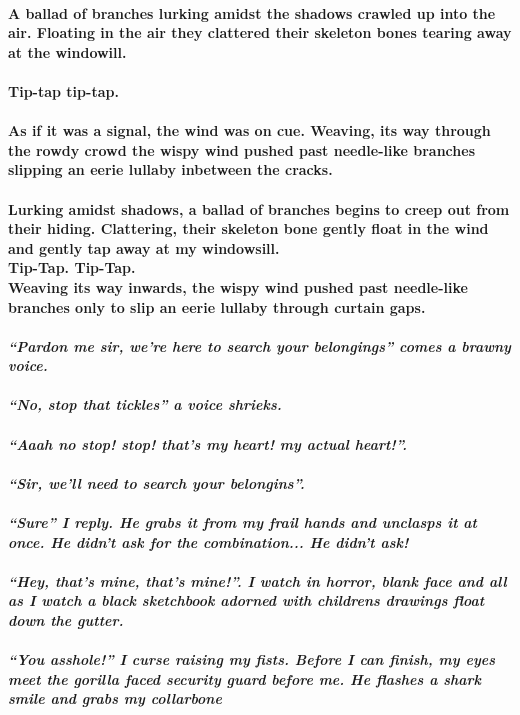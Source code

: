 \documentclass{book}
\begin{document}
\paragraph{A ballad of branches lurking amidst the shadows crawled up into the air. Floating in the air they clattered their skeleton bones tearing away at the windowill.\\\\Tip-tap tip-tap.\\\\As if it was a signal, the wind was on cue. Weaving, its way through the rowdy crowd the wispy wind pushed past needle-like branches slipping an eerie lullaby inbetween the cracks.}
\paragraph{Lurking amidst shadows, a ballad of branches begins to creep out from their hiding. Clattering, their skeleton bone gently float in the wind and gently tap away at my windowsill.\\Tip-Tap. Tip-Tap.\\Weaving its way inwards, the wispy wind pushed past needle-like branches only to slip an eerie lullaby through curtain gaps.}

\paragraph{\textit{``Pardon me sir, we're here to search your belongings'' comes a brawny voice.\\\\``No, stop that tickles'' a voice shrieks.\\\\``Aaah no stop! stop! that's my heart! my actual heart!''.\\\\``Sir, we'll need to search your belongins''.\\\\``Sure'' I reply. He grabs it from my frail hands and unclasps it at once. \textbf{He didn't ask for the combination... He didn't ask!}\\\\``Hey, that's mine, that's mine!''. I watch in horror, blank face and all as I watch a black sketchbook adorned with childrens drawings float down the gutter.\\\\``You asshole!'' I curse raising my fists. Before I can finish, my eyes meet the gorilla faced security guard before me. He flashes a shark smile and grabs my collarbone}}
\end{document}

